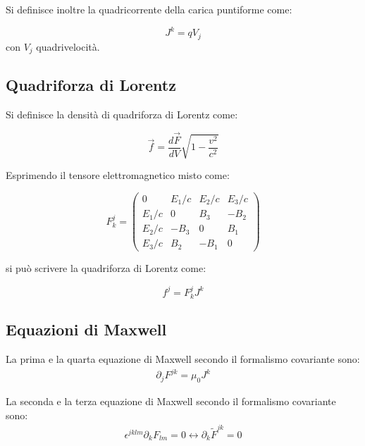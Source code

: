 \documentclass{article}
\begin{document}
Si definisce inoltre la quadricorrente della carica puntiforme come:

\begin{equation}
    J^k=qV_j
\end{equation}
con $V_j$ quadrivelocità.

\subsection*{Quadriforza di Lorentz}

Si definisce la densità di quadriforza di Lorentz come:

\begin{equation}
    \vec{f}=\frac{d \vec{F}}{dV}\sqrt{1-\frac{v^2}{c^2}}
\end{equation}

Esprimendo il tensore elettromagnetico misto come:

\begin{equation}
    F^j_k=
    \begin{pmatrix}
        0     & E_1/c & E_2/c & E_3/c \\
        E_1/c & 0     & B_3   & -B_2  \\
        E_2/c & -B_3  & 0     & B_1   \\
        E_3/c & B_2   & -B_1  & 0
    \end{pmatrix}
\end{equation}

si può scrivere la quadriforza di Lorentz come:

\begin{equation}
    f^j=F^j_k J^k
\end{equation}

\subsection{Equazioni di Maxwell}

La prima e la quarta equazione di Maxwell secondo il formalismo covariante sono:
\begin{equation}
    \begin{aligned}
        \partial_j F^{jk}=\mu_0 J^k
    \end{aligned}
\end{equation}

La seconda e la terza equazione di Maxwell secondo il formalismo covariante sono:
\begin{equation}
    \begin{aligned}
        \epsilon^{jklm}\partial_k F_{lm}=0 \leftrightarrow \partial_k \tilde F^{jk}=0
    \end{aligned}
\end{equation}
\end{document}
